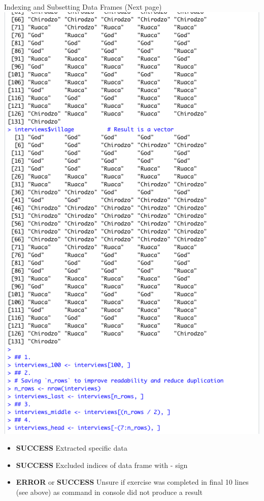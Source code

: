 \documentclass{article}
\begin{document}
Indexing and Subsetting Data Frames (Next page) \\
\includegraphics[width=\textwidth]{Images/RStudio_10.png}
\begin{itemize}
\item \textbf{SUCCESS} Extracted specific data 
\item \textbf{SUCCESS} Excluded indices of data frame with - sign
\item \textbf{ERROR} or \textbf{SUCCESS} Unsure if exercise was completed in final 10 lines (see above) as command in console did not produce a result
\end{itemize}
\end{document}
